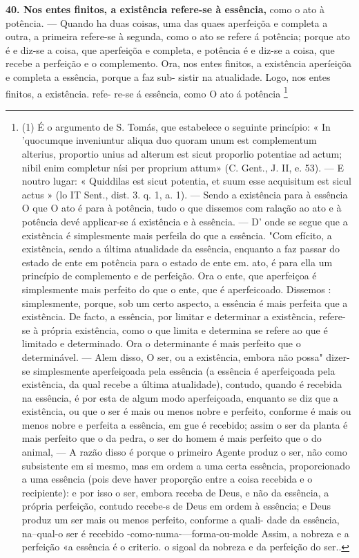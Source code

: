 \documentclass[12pt,a4paper]{article}
\newcommand{\pagmark}[1]{\quad[\textit{p.\,#1}]\quad}
\begin{document}
{{{{{{{{{{\medskip\noindent\textbf{40. Nos entes finitos, a existência refere-se à essência,}
como o ato à potência. — Quando ha duas coisas, uma das
 quaes aperfeiçõa e completa a outra, a primeira refere-se à segunda, como o ato se refere á potência; porque ato é e diz-se
 a coisa, que aperfeiçõa e completa, e potência é e diz-se a coisa,
 que recebe a perfeição e o complemento. Ora, nos entes finitos,
 a existência aperíeiçõa e completa a essência, porque a faz sub-
 sistir na atualidade. Logo, nos entes finitos, a existência. refe-
 re-se á essência, como O ato á potência \footnote{(1) É o argumento de S. Tomás, que estabelece o seguinte princípio:
« In 'quocumque inveniuntur aliqua duo quoram unum est complementum
alterius, proportio unius ad alterum est sicut proporlio potentiae ad actum;
nibil enim completur nísi per proprium attum» (C. Gent., J. II, e. 53). —
E noutro lugar: « Quiddilas est sicut potentia, et suum esse acquisitum est
sicul actus
 » (lo IT Sent., dist. 3. q. 1, a. 1). — Sendo a existência para à
essência O que O ato é para à potência, tudo o que dissemos com ralação
ao ato e à potência devé applicar-se á existência e à essência. — D' onde
se segue que a existência é simplesmente mais perfeila do que a essência.
"Com efícito, a existência, sendo a última atualidade da essência, enquanto
a faz passar do estado de ente em potência para o estado de ente em. ato,
é para ella um princípio de complemento e de perfeição. Ora o ente, que
aperfeiçoa é simplesmente mais perfeito do que o ente, que é aperfeicoado.
 Dissemos : simplesmente, porque, sob um certo aspecto, a essência é mais
perfeita que a existência. De facto, a essência, por limitar e determinar a
existência, refere-se à própria existência, como o que limita e determina se
refere ao que é limitado e determinado. Ora
 o determinante é mais perfeito
que o determinável. — Alem disso, O ser, ou a existência, embora não possa"
dizer-se simplesmente aperfeiçoada pela essência (a essência é aperfeiçoada
pela existência, da qual recebe a última atualidade), contudo, quando é
recebida na essência, é por esta de algum modo aperfeiçoada, enquanto
 se
diz que a existência, ou que o ser é mais ou menos nobre e perfeito, conforme
é mais ou menos nobre e perfeita a essência, em gue é recebido; assim o
ser da planta é mais perfeito que o da pedra, o ser do homem é mais perfeito que o do animal, — A razão disso é porque o primeiro Agente produz
o ser, não como subsistente em si mesmo, mas em ordem a uma certa
essência, proporcionado a uma essência (pois deve haver proporção entre a
coisa recebida e o recipiente): e por isso o ser, embora receba de Deus,
 e
não da essência, a própria perfeição, contudo recebe-s de Deus em
 ordem à
\pagmark{313}
essência; e Deus produz um ser mais ou menos perfeito, conforme a quali-
 dade da essência, na--qual-o ser é recebido -como-numa-—forma-ou-molde
 Assim, a nobreza e a perfeição «a essência é o criterio. o sigoal da nobreza
 e da perfeição do ser.. 
\pagmark{313}

}}}}}}}}}}}
\end{document}
